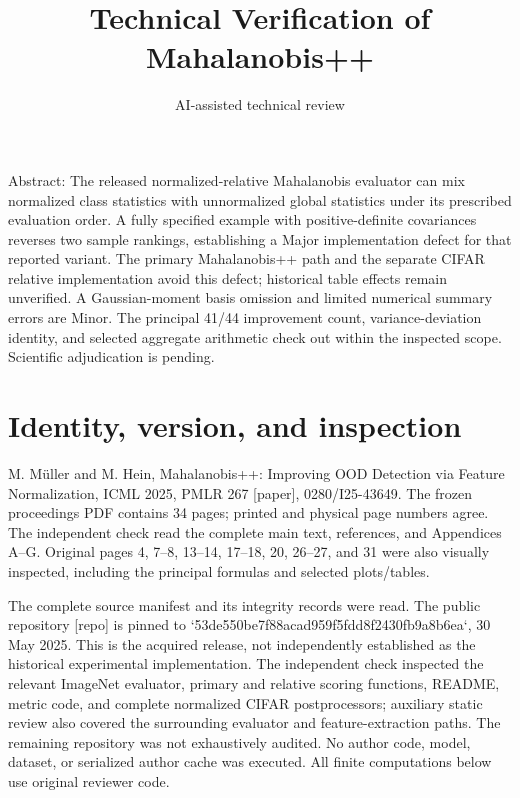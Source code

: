 \documentclass[10pt]{article}
\title{Technical Verification of Mahalanobis++}
\author{AI-assisted technical review}
\date{}
\begin{document}
\maketitle
Abstract: The released normalized-relative Mahalanobis evaluator can mix normalized class statistics with unnormalized global statistics under its prescribed evaluation order. A fully specified example with positive-definite covariances reverses two sample rankings, establishing a Major implementation defect for that reported variant. The primary Mahalanobis++ path and the separate CIFAR relative implementation avoid this defect; historical table effects remain unverified. A Gaussian-moment basis omission and limited numerical summary errors are Minor. The principal 41/44 improvement count, variance-deviation identity, and selected aggregate arithmetic check out within the inspected scope. Scientific adjudication is pending.\par
\section*{Identity, version, and inspection}
M. Müller and M. Hein, Mahalanobis++: Improving OOD Detection via Feature Normalization, ICML 2025, PMLR 267 [paper], 0280/I25-43649. The frozen proceedings PDF contains 34 pages; printed and physical page numbers agree. The independent check read the complete main text, references, and Appendices A–G. Original pages 4, 7–8, 13–14, 17–18, 20, 26–27, and 31 were also visually inspected, including the principal formulas and selected plots/tables.\par
The complete source manifest and its integrity records were read. The public repository [repo] is pinned to `53de550be7f88acad959f5fdd8f2430fb9a8b6ea`, 30 May 2025. This is the acquired release, not independently established as the historical experimental implementation. The independent check inspected the relevant ImageNet evaluator, primary and relative scoring functions, README, metric code, and complete normalized CIFAR postprocessors; auxiliary static review also covered the surrounding evaluator and feature-extraction paths. The remaining repository was not exhaustively audited. No author code, model, dataset, or serialized author cache was executed. All finite computations below use original reviewer code.\par
\end{document}
